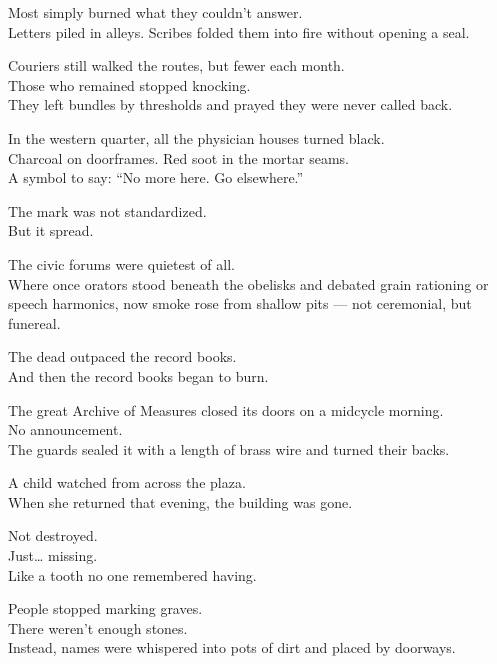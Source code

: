 \documentclass[12pt]{article}
\begin{document}
Most simply burned what they couldn’t answer.\\
Letters piled in alleys. Scribes folded them into fire without opening a seal.

\vspace{1em}

Couriers still walked the routes, but fewer each month.\\
Those who remained stopped knocking.\\
They left bundles by thresholds and prayed they were never called back.

\vspace{1em}

In the western quarter, all the physician houses turned black.\\
Charcoal on doorframes. Red soot in the mortar seams.\\
A symbol to say: “No more here. Go elsewhere.”

The mark was not standardized.\\
But it spread.

\vspace{1em}

The civic forums were quietest of all.\\
Where once orators stood beneath the obelisks and debated grain rationing or speech harmonics, now smoke rose from shallow pits — not ceremonial, but funereal.

The dead outpaced the record books.\\
And then the record books began to burn.

\vspace{1em}

The great Archive of Measures closed its doors on a midcycle morning.\\
No announcement.\\
The guards sealed it with a length of brass wire and turned their backs.

A child watched from across the plaza.\\
When she returned that evening, the building was gone.

Not destroyed.\\
Just… missing.\\
Like a tooth no one remembered having.

\vspace{1em}

People stopped marking graves.\\
There weren’t enough stones.\\
Instead, names were whispered into pots of dirt and placed by doorways.
\end{document}
